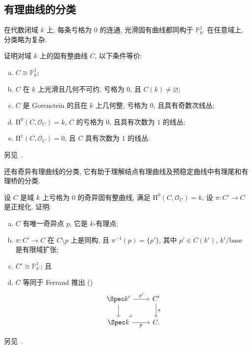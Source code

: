 \subsection{有理曲线的分类}\label{src:6.1.4-subsection}
在代数闭域 $k$ 上, 每条亏格为 $0$ 的连通, 光滑固有曲线都同构于 $\mathbb P_k^1$. 在任意域上, 分类略为复杂.
\begin{exercise}[射影直线的分类]\label{src:6.1.13}
证明对域 $k$ 上的固有整曲线 $C$, 以下条件等价:
\begin{enumerate}[(a)]
\item $C\cong\mathbb P_k^1$;
\item $C$ 在 $k$ 上光滑且几何不可约, 亏格为 $0$, 且 $C(k)\neq\varnothing$;
\item $C$ 是 Gorenstein 的且在 $k$ 上几何整, 亏格为 $0$, 且具有奇数次线丛;
\item $\mathrm H^0(C,\allowbreak \mathcal O_C)=k$, $C$ 的亏格为 $0$, 且具有次数为 $1$ 的线丛;
\item $\mathrm H^1(C,\allowbreak \mathcal O_C)=0$, 且 $C$ 具有次数为 $1$ 的线丛.
\end{enumerate}
另见~\cite[Tag 0C6U]{SP}.
\end{exercise}
还有奇异有理曲线的分类, 它有助于理解结点有理曲线及预稳定曲线中有理尾和有理桥的分类.
\begin{exercise}[奇异有理曲线的分类]\label{src:6.1.14}
设 $C$ 是域 $k$ 上亏格为 $0$ 的奇异固有整曲线, 满足 $\mathrm H^0(C,\allowbreak \mathcal O_C)=k$, 设 $\pi:C'\to\allowbreak C$ 是正规化. 证明:
\begin{enumerate}[(a)]
\item $C$ 有唯一奇异点 $p$, 它是 $k$-有理点;
\item $\pi:C'\to\allowbreak C$ 在 $C\setminus p$ 上是同构, 且 $\pi^{-1}(p)=\{p'\}$, 其中 $p'\in C(k')$, $k'/\mathrm{base}$ 是有限域扩张;
\item $C'\cong\mathbb P_{k'}^1$; 且
\item $C$ 等同于 Ferrand 推出 ()
\[
\begin{tikzcd}
\Spec k'\arrow[r,"p'"]\arrow[d]&C'\arrow[d,"\pi"]\\
\Spec k\arrow[r,"p"']\arrow[ur,phantom,"\lrcorner",very near start]&C.
\end{tikzcd}
\]
\end{enumerate}
另见~\cite[Tag 0DJB]{SP}.
\end{exercise}
